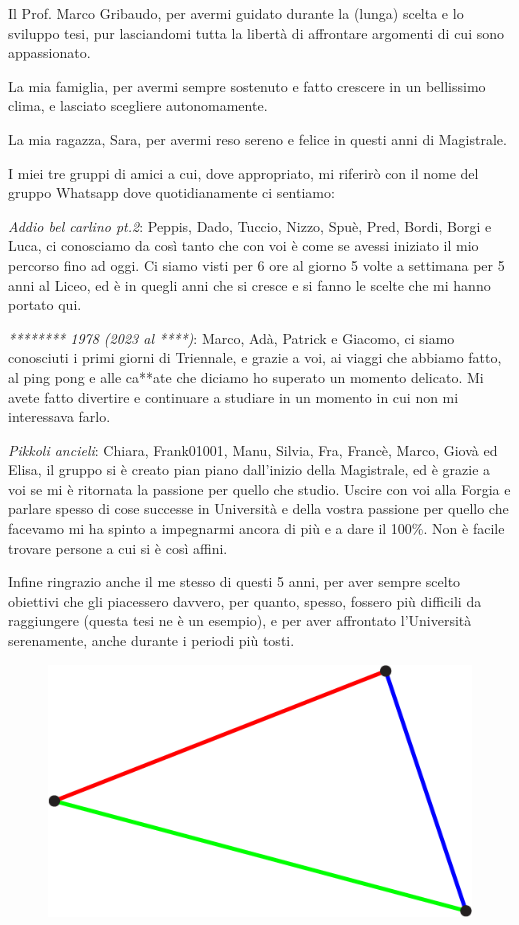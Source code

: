 \documentclass{PoliMi_MasterThesis}
\newcommand*\triangleLogo{
	\clearpage
	\thispagestyle{empty}
	\newpage
	\begin{figure}
		\centering
		\includegraphics[width=\textwidth]{Images/triangle_logo_thin.png} 
	\end{figure}
}
\begin{document}
Il Prof. Marco Gribaudo, per avermi guidato durante la (lunga) scelta e lo sviluppo tesi, pur lasciandomi tutta la libertà di affrontare argomenti di cui sono appassionato.

La mia famiglia, per avermi sempre sostenuto e fatto crescere in un bellissimo clima, e lasciato scegliere autonomamente.

La mia ragazza, Sara, per avermi reso sereno e felice in questi anni di Magistrale.

I miei tre gruppi di amici a cui, dove appropriato, mi riferirò con il nome del gruppo Whatsapp dove quotidianamente ci sentiamo:

\textit{Addio bel carlino pt.2}: Peppis, Dado, Tuccio, Nizzo, Spuè, Pred, Bordi, Borgi e Luca, ci conosciamo da così tanto che con voi è come se avessi iniziato il mio percorso fino ad oggi. Ci siamo visti per 6 ore al giorno 5 volte a settimana per 5 anni al Liceo, ed è in quegli anni che si cresce e si fanno le scelte che mi hanno portato qui.

\textit{******** 1978 (2023 al ****)}: Marco, Adà, Patrick e Giacomo, ci siamo conosciuti i primi giorni di Triennale, e grazie a voi, ai viaggi che abbiamo fatto, al ping pong e alle ca**ate che diciamo ho superato un momento delicato. Mi avete fatto divertire e continuare a studiare in un momento in cui non mi interessava farlo.

\textit{Pikkoli ancieli}: Chiara, Frank01001, Manu, Silvia, Fra, Francè, Marco, Giovà ed Elisa, il gruppo si è creato pian piano dall'inizio della Magistrale, ed è grazie a voi se mi è ritornata la passione per quello che studio. Uscire con voi alla Forgia e parlare spesso di cose successe in Università e della vostra passione per quello che facevamo mi ha spinto a impegnarmi ancora di più e a dare il 100$\%$. Non è facile trovare persone a cui si è così affini.

Infine ringrazio anche il me stesso di questi 5 anni, per aver sempre scelto obiettivi che gli piacessero davvero, per quanto, spesso, fossero più difficili da raggiungere (questa tesi ne è un esempio), e per aver affrontato l'Università serenamente, anche durante i periodi più tosti. 
\normalsize


\ClearShipoutPicture

\triangleLogo
\end{document}
